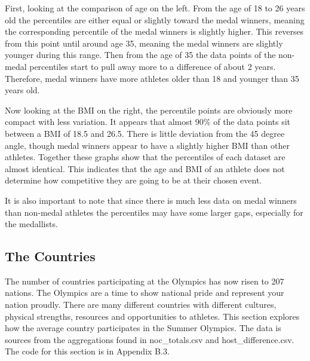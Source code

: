 \documentclass[a4 paper, 12pt]{article}
\begin{document}
        First, looking at the comparison of age on the left. From the age of 18 to 26 years old the percentiles are either equal or slightly toward the medal winners, meaning the corresponding percentile of the medal winners is slightly higher. This reverses from this point until around age 35, meaning the medal winners are slightly younger during this range. Then from the age of 35 the data points of the non-medal percentiles start to pull away more to a difference of about 2 years. Therefore, medal winners have more athletes older than 18 and younger than 35 years old. 

        Now looking at the BMI on the right, the percentile points are obviously more compact with less variation. It appears that almost 90\% of the data points sit between a BMI of 18.5 and 26.5. There is little deviation from the 45 degree angle, though medal winners appear to have a slightly higher BMI than other athletes. Together these graphs show that the percentiles of each dataset are almost identical. This indicates that the age and BMI of an athlete does not determine how competitive they are going to be at their chosen event.

        It is also important to note that since there is much less data on medal winners than non-medal athletes the percentiles may have some larger gaps, especially for the medallists.
    
    \subsection{The Countries}
    The number of countries participating at the Olympics has now risen to 207 nations. The Olympics are a time to show national pride and represent your nation proudly. There are many different countries with different cultures, physical strengths, resources and opportunities to athletes. This section explores how the average country participates in the Summer Olympics. The data is sources from the aggregations found in noc\_totals.csv and host\_difference.csv. The code for this section is in Appendix B.3.
\end{document}
